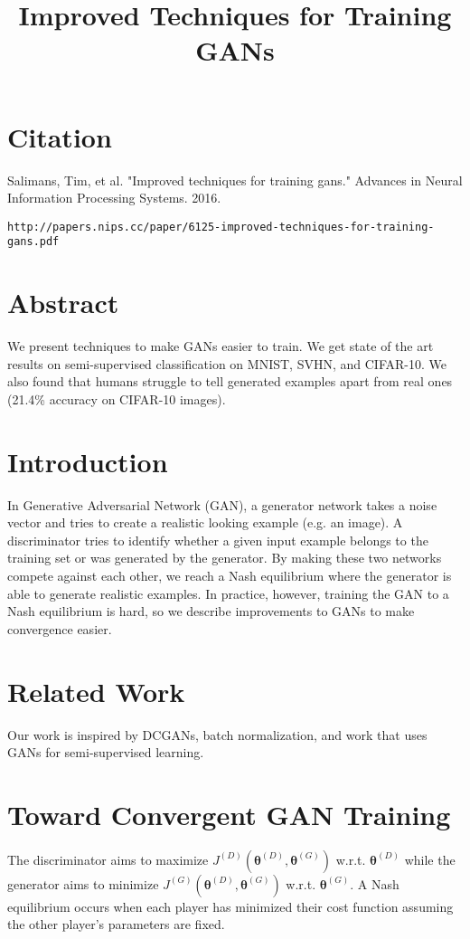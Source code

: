 \documentclass[a4paper]{article}
\title{Improved Techniques for Training GANs}
\date{}
\begin{document}
\maketitle

\section{Citation}
Salimans, Tim, et al. "Improved techniques for training gans." Advances in Neural Information Processing Systems. 2016.

\begin{verbatim}
http://papers.nips.cc/paper/6125-improved-techniques-for-training-gans.pdf
\end{verbatim}

\section{Abstract}
We present techniques to make GANs easier to train. We get state of the art
results on semi-supervised classification on MNIST, SVHN, and CIFAR-10. We also
found that humans struggle to tell generated examples apart from real ones
(21.4\% accuracy on CIFAR-10 images).

\section{Introduction}
In Generative Adversarial Network (GAN), a generator network takes a noise
vector and tries to create a realistic looking example (e.g. an image). A
discriminator tries to identify whether a given input example belongs to the
training set or was generated by the generator. By making these two
networks compete against each other, we reach a Nash equilibrium where
the generator is able to generate realistic examples. In practice, however,
training the GAN to a Nash equilibrium is hard, so we describe improvements to
GANs to make convergence easier.

\section{Related Work}
Our work is inspired by DCGANs, batch normalization, and work that uses GANs
for semi-supervised learning.

\section{Toward Convergent GAN Training}
The discriminator aims to maximize
$J^{(D)}(\bm{\theta}^{(D)}, \bm{\theta}^{(G)})$ w.r.t. $\bm{\theta}^{(D)}$ while
the generator aims to minimize $J^{(G)}(\bm{\theta}^{(D)}, \bm{\theta}^{(G)})$
w.r.t. $\bm{\theta}^{(G)}$. A Nash equilibrium occurs when each player has
minimized their cost function assuming the other player's parameters are fixed.
\end{document}
